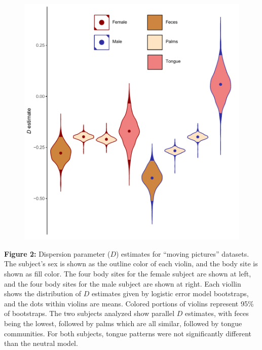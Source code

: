 \documentclass{article}
\begin{document}
{\begin{figure}[t]
	\centering
	\includegraphics[scale=0.80]{figs/Fig_2.pdf}
\end{figure}
\textbf{Figure 2:}\label{sec:figure2} Dispersion parameter (\(D\)) estimates for “moving pictures” \cite{Caporaso2011} datasets. The subject’s sex is shown as the outline color of each violin, and the body site is shown as fill color. The four body sites for the female subject are shown at left, and the four body sites for the male subject are shown at right. Each viollin shows the distribution of \(D\) estimates given by logistic error model bootstraps, and the dots within violins are means. Colored portions of violins represent 95\% of bootstraps. The two subjects analyzed show parallel \(D\) estimates, with feces being the lowest, followed by palms which are all similar, followed by tongue communities. For both subjects, tongue patterns were not significantly different than the neutral model.
\newpage

}
\end{document}
